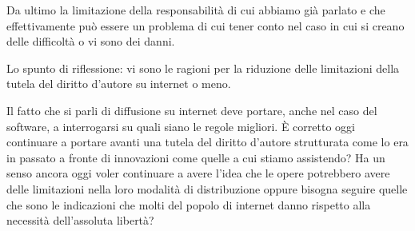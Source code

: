 Da ultimo la limitazione della responsabilità di cui abbiamo già parlato e che effettivamente può essere un problema di cui tener conto nel caso in cui si creano delle difficoltà o vi sono dei danni. 

Lo spunto di riflessione: vi sono le ragioni per la riduzione delle limitazioni della tutela del diritto d'autore su internet o meno.

Il fatto che si parli di diffusione su internet deve portare, anche nel caso del software, a interrogarsi su quali siano le regole migliori. È corretto oggi continuare a portare avanti una tutela del diritto d'autore strutturata come lo era in passato a fronte di innovazioni come quelle a cui stiamo assistendo? Ha un senso ancora oggi voler continuare a avere l'idea che le opere potrebbero avere delle limitazioni nella loro modalità di distribuzione oppure bisogna seguire quelle che sono le indicazioni che molti del popolo di internet danno rispetto alla necessità dell'assoluta libertà?

